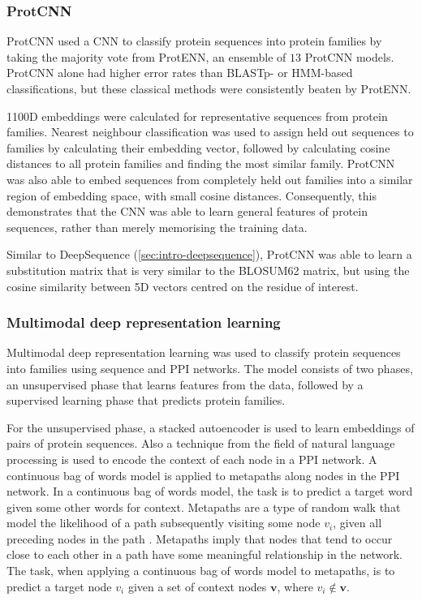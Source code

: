 \subsubsection{ProtCNN}

ProtCNN \cite{Bileschi2019} used a CNN to classify protein sequences into protein families by taking the majority vote from ProtENN, an ensemble of $13$ ProtCNN models. ProtCNN alone had higher error rates than BLASTp- or HMM-based classifications, but these classical methods were consistently beaten by ProtENN.

\num{1100}D embeddings were calculated for representative sequences from protein families. Nearest neighbour classification was used to assign held out sequences to families by calculating their embedding vector, followed by calculating cosine distances to all protein families and finding the most similar family. ProtCNN was also able to embed sequences from completely held out families into a similar region of embedding space, with small cosine distances. Consequently, this demonstrates that the CNN was able to learn general features of protein sequences, rather than merely memorising the training data.

Similar to DeepSequence \cite{Riesselman2018} (\ref{sec:intro-deepsequence}), ProtCNN was able to learn a substitution matrix that is very similar to the BLOSUM62 matrix, but using the cosine similarity between 5D vectors centred on the residue of interest.

\subsubsection{Multimodal deep representation learning}

Multimodal deep representation learning \cite{Zhang2019} was used to classify protein sequences into families using sequence and PPI networks. The model consists of two phases, an unsupervised phase that learns features from the data, followed by a supervised learning phase that predicts protein families.

For the unsupervised phase, a stacked autoencoder is used to learn embeddings of pairs of protein sequences. Also a technique from the field of natural language processing is used to encode the context of each node in a PPI network. A continuous bag of words model is applied to metapaths along nodes in the PPI network. In a continuous bag of words model, the task is to predict a target word given some other words for context. Metapaths are a type of random walk that model the likelihood of a path subsequently visiting some node $v_i$, given all preceding nodes in the path \cite{Dong2017}. Metapaths imply that nodes that tend to occur close to each other in a path have some meaningful relationship in the network. The task, when applying a continuous bag of words model to metapaths, is to predict a target node $v_i$ given a set of context nodes $\mathbf{v}$, where $v_i \notin \mathbf{v}$.


